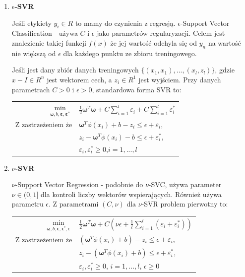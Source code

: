 \documentclass[paper=a4, fontsize=11pt]{scrartcl} %
\numberwithin{equation}{section} %
\numberwithin{figure}{section} %
\begin{document}
\begin{enumerate}
\item \textbf{$\epsilon$-SVR}
    \par Jeśli etykiety $y_i \in R$ to mamy do czynienia z regresją.
    $\epsilon$-Support Vector Classification -  używa $C$ i $\epsilon$ jako
    parametrów regularyzacji. Celem jest znalezienie takiej funkcji $f(x)$
    że jej wartość odchyla się od $y_n$ na wartość nie większą od $\epsilon$
    dla każdego punktu ze zbioru treningowego.
    \par Jeśli jest dany zbiór danych treningowych $\{(x_1, x_1),...,
    (x_l, z_l)\}$, gdzie $x-I \in R^n$ jest wektorem cech, a $z_i \in R^1$
    jest wyjściem. Przy danych parametrach $C>0$ i $\epsilon > 0$, standardowa 
    forma SVR to:

    \begin{center}
        \begin{tabular}{rl}
            $\min\limits_{\pmb{\omega},b,\pmb{\varepsilon}, \pmb{\varepsilon}^*}$ &
            $\frac{1}{2}\pmb{\omega}^T\pmb{\omega} + C\sum\limits_{i=1}^{l}
            \varepsilon_i + C\sum\limits_{i=1}^{l}\varepsilon_{i}^{*}$ \\
            Z zastrzeżeniem że & $\pmb{\omega}^T\phi(x_i) + b - z_i \leq \epsilon + \varepsilon_i$, \\
                           & $z_i - \pmb{\omega}^T\phi(x_i) - b \leq  \epsilon + \varepsilon_i^*$, \\
                           & $\varepsilon_i,\varepsilon_i^* \geq 0$,$i=1,...,l$

        \end{tabular}
    \end{center}

\item \textbf{$\nu$-SVR}
    \par $\nu$-Support Vector Regression - podobnie do $\nu$-SVC, używa parameter $\nu\in(0,1]$
    dla kontroli liczby wektorów wspierających. Również używa parametru $\epsilon$. Z parametrami
    $(C,\nu)$ dla $\nu$-SVR problem pierwotny to:
    
    \begin{center}
        \begin{tabular}{rl}
            $\min\limits_{\pmb{\omega},b,\pmb{\epsilon},\pmb{\epsilon}^*,\epsilon}$ &
            $\frac{1}{2}\pmb{\omega}^T\pmb{\omega} + C(\nu\epsilon + \frac{1}{l}
            \sum\limits_{i=1}^{l}(\varepsilon_i+\varepsilon_i^*))$ \\
            Z zastrzeżeniem że & 
            $(\pmb{\omega}^T\phi(x_i) + b) - z_i \leq \epsilon + \varepsilon_i$,\\
           & $z_i - (\pmb{\omega}^T\phi(x_i) + b) \leq \epsilon + \varepsilon_i^*$,\\
           & $\varepsilon_i,\varepsilon_i^* \geq 0$, $i=1,...,l$, $\epsilon \geq 0$
        \end{tabular}
    \end{center}

\end{enumerate}
\end{document}
